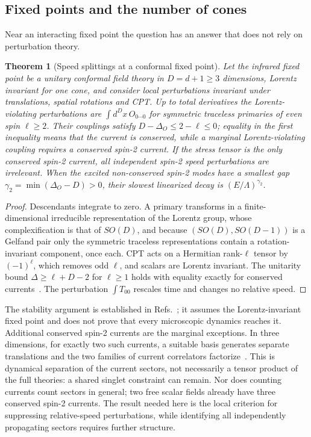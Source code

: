 \documentclass[12pt]{article}
\newtheorem{theorem}{Theorem}
\theoremstyle{definition}
\theoremstyle{remark}
\begin{document}
\subsection{Fixed points and the number of cones}

Near an interacting fixed point the question has an answer that does not rely on perturbation theory.

\begin{theorem}[Speed splittings at a conformal fixed point]
\label{thm:cft-cones}
Let the infrared fixed point be a unitary conformal field theory in $D=d+1\ge3$ dimensions, Lorentz invariant for one cone, and consider local perturbations invariant under translations, spatial rotations and CPT. Up to total derivatives the Lorentz-violating perturbations are $\int d^Dx\,O_{0\cdots0}$ for symmetric traceless primaries of even spin $\ell\ge2$. Their couplings satisfy $D-\Delta_O\le2-\ell\le0$; equality in the first inequality means that the current is conserved, while a marginal Lorentz-violating coupling requires a conserved spin-2 current. If the stress tensor is the only conserved spin-2 current, all independent spin-2 speed perturbations are irrelevant. When the excited non-conserved spin-2 modes have a smallest gap $\gamma_2=\min(\Delta_O-D)>0$, their slowest linearized decay is $(E/\Lambda)^{\gamma_2}$.
\end{theorem}

\begin{proof}
Descendants integrate to zero. A primary transforms in a finite-dimensional irreducible representation of the Lorentz group, whose complexification is that of $SO(D)$, and because $(SO(D),SO(D-1))$ is a Gelfand pair only the symmetric traceless representations contain a rotation-invariant component, once each. CPT acts on a Hermitian rank-$\ell$ tensor by $(-1)^\ell$, which removes odd $\ell$, and scalars are Lorentz invariant. The unitarity bound $\Delta\ge\ell+D-2$ for $\ell\ge1$ holds with equality exactly for conserved currents~\cite{Mack1977,Minwalla1998}. The perturbation $\int T_{00}$ rescales time and changes no relative speed.
\end{proof}

The stability argument is established in Refs.~\cite{Sundrum2012,BednikPujolasSibiryakov2013}; it assumes the Lorentz-invariant fixed point and does not prove that every microscopic dynamics reaches it. Additional conserved spin-2 currents are the marginal exceptions. In three dimensions, for exactly two such currents, a suitable basis generates separate translations and the two families of current correlators factorize~\cite[Section 8]{MaldacenaZhiboedov2011}. This is dynamical separation of the current sectors, not necessarily a tensor product of the full theories: a shared singlet constraint can remain. Nor does counting currents count sectors in general; two free scalar fields already have three conserved spin-2 currents. The result needed here is the local criterion for suppressing relative-speed perturbations, while identifying all independently propagating sectors requires further structure.
\end{document}
